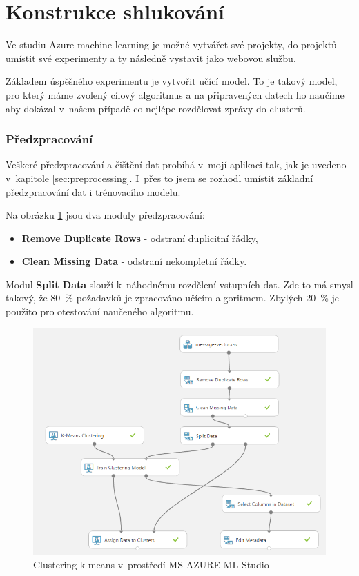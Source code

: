 \documentclass[thesis=M,czech]{FITthesis}[2012/10/20]
\newcommand{\tmpframe}[1]{\fbox{#1}}
\renewcommand{\tmpframe}[1]{#1}
\begin{document}
		
	\section{Konstrukce shlukování}
		\label{sec:construc_clustering}		
		Ve studiu Azure machine learning je možné vytvářet své projekty, do projektů umístit své experimenty a ty následně vystavit jako webovou službu.
		
		Základem úspěšného experimentu je vytvořit učící model. To je takový model, pro který máme zvolený cílový algoritmus a na připravených datech ho naučíme aby dokázal v~našem případě co nejlépe rozdělovat zprávy do clusterů.
		
		\subsubsection{Předzpracování}
		Veškeré předzpracování a čištění dat probíhá v~mojí aplikaci tak, jak je uvedeno v~kapitole \ref{sec:preprocessing}. I~přes to jsem se rozhodl umístit základní předzpracování dat i trénovacího modelu.
		
		Na obrázku \ref{fig:k-means_azure} jsou dva moduly předzpracování:
		
		\begin{itemize} 
			\item \textbf{Remove Duplicate Rows} - odstraní duplicitní řádky,
			\item \textbf{Clean Missing Data} - odstraní nekompletní řádky.	
		\end{itemize}
	
		Modul \textbf{Split Data} slouží k~náhodnému rozdělení vstupních dat. Zde to má smysl takový, že 80~\% požadavků je zpracováno učícím algoritmem. Zbylých 20~\% je použito pro otestování naučeného algoritmu. 
		
		\begin{figure}[htb]\centering
			\tmpframe{\includegraphics[width=\textwidth]{./img/azureTrainingKmeans}}	
			\caption{Clustering k-means v~prostředí MS AZURE ML Studio}
			\label{fig:k-means_azure}
		\end{figure}
	
\end{document}
